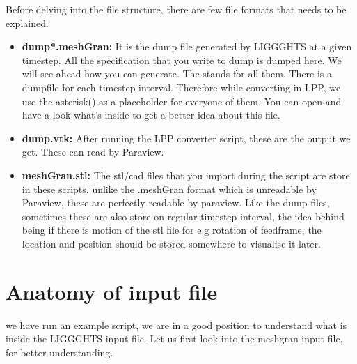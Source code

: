 \documentclass{tufte-book} %
\begin{document}
Before delving into the file structure, there are few file formats that needs to be explained.
\begin{itemize}
\item \textbf{dump*.meshGran:} It is the dump file generated by LIGGGHTS at a given timestep. All the specification that you write to dump is dumped here. We will see ahead how you can generate. The \* stands for all them. There is a dumpfile for each timestep interval. Therefore while converting in LPP, we use the asterisk(\*) as a placeholder for everyone of them.  You can open and have a look what's inside to get a better idea about this file.
\item \textbf{dump.vtk:} After running the LPP converter script, these are the output we get. These can read by Paraview. 
\item \textbf{meshGran.stl:} The stl/cad files that you import during the script are store in these scripts. unlike the .meshGran format which is unreadable by Paraview, these are perfectly readable by paraview. Like the dump files, sometimes these are also store on regular timestep interval, the idea behind being if there is motion of the stl file for e.g rotation of feedframe, the location and position should be stored somewhere to visualise it later. 
\end{itemize}
 \section{Anatomy of input file}

 \begin{fullwidth}
    we have run an example script, we are in a good position to understand what is inside the LIGGGHTS input file.
   Let us first look into the meshgran input file, for better understanding.
 \end{fullwidth}

 
   
 \inputminted{cpp}{in.meshGran}
   
  
\end{document}
